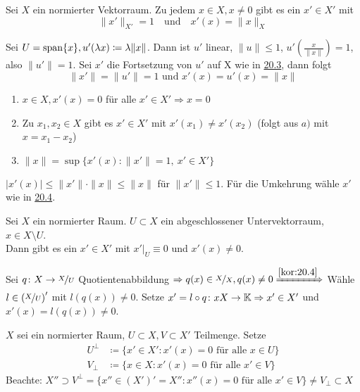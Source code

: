 \begin{kor} \label{kor:20.4}
	Sei $X$ ein normierter Vektorraum. Zu jedem $x \in X, x \neq 0$ gibt es ein $x' \in X'$ mit 
		\[ \| x' \|_{X'} = 1 \quad \text{und} \quad x'(x) = \| x \|_{X} \]
\end{kor}

\begin{beweis}
	Sei $U = \operatorname{span} \{ x \}, u'( \lambda x) \coloneqq \lambda \| x \|$. Dann ist $u'$ linear, $\| u \| \leq 1$, $u'(\frac{x}{\| x \|}) = 1$, also $\| u' \| = 1$. Sei $x'$ die Fortsetzung von $u'$ auf X wie in \hyperref[satz:20.3-Hahn-Banach]{20.3}, dann folgt
	\[ \| x' \| = \| u' \| = 1 \text{ und } x'(x) = u'(x) = \| x \| \]
\end{beweis}


\begin{folgerung}
	\begin{enumerate}[label=\alph*\upshape)]
		\item $x \in X, x'(x) = 0$ für alle $x' \in X' \Rightarrow x = 0$
		\item Zu $x_{1}, x_{2} \in X$ gibt es $x' \in X'$ mit $x'(x_{1}) \neq x'(x_{2})$ (folgt aus $a)$ mit $x = x_{1} - x_{2}$)
		\item $\| x \| = \sup \{ x'(x) : \| x' \| = 1, ~ x' \in X' \}$
	\end{enumerate}	
\end{folgerung}

\begin{beweis}
	$|x'(x) | \leq \| x' \| \cdot \| x \| \leq \| x \|$ für $\| x' \| \leq 1$.
	Für die Umkehrung wähle $x'$ wie in \hyperref[kor:20.4]{20.4}.
\end{beweis}


\begin{kor} \label{kor:20.6}
	Sei $X$ ein normierter Raum. $U \subset X$ ein abgeschlossener Untervektorraum, $x \in X \setminus U$. \\
	Dann gibt es ein $x' \in X'$ mit $x'|_{U} \equiv 0$ und $x'(x) \neq 0$.	
\end{kor}

\begin{beweis}
	Sei $q \colon X \rightarrow \nicefrac{X}{U}$ Quotientenabbildung $\Rightarrow q(x) \in \nicefrac{X}{X}, q(x) \neq 0 \xRightarrow[]{\ref{kor:20.4}}$ Wähle $l \in \left(\nicefrac{X}{U}\right)'$ mit $l(q(x)) \neq 0$. Setze $x' = l \circ q \colon xX\rightarrow \mathbb{K} \Rightarrow x' \in X'$ und $x'(x) = l(q(x)) \neq 0$.
\end{beweis}


\begin{definition}
	$X$ sei ein normierter Raum, $U \subset X, V \subset X'$ Teilmenge. Setze
	\begin{align*}
		U^{\bot} & \coloneqq \{ x' \in X' : x'(x) = 0 \text{ für alle } x \in U \} \\
		V_{\bot} & \coloneqq \{ x \in X : x'(x) = 0 \text{ für alle } x' \in V \} 
	\end{align*}
	Beachte: $X'' \supset V^{\bot} = \{  x'' \in \left( X' \right)' = X'' : x''(x) = 0 \text{ für alle } x' \in V \} \neq V_{\bot} \subset X$
\end{definition}


